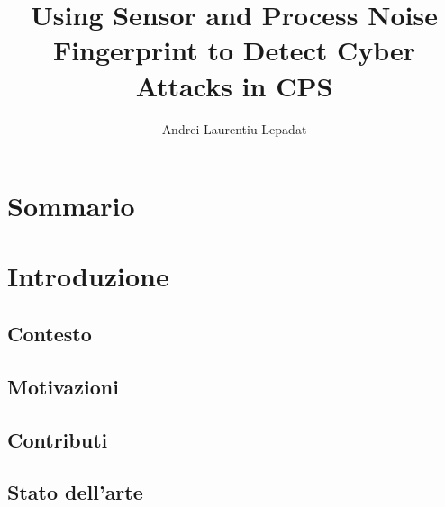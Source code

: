 \documentclass[Lau,binding=0.6cm]{sapthesis}
\title{Using Sensor and Process Noise Fingerprint to Detect Cyber Attacks in CPS}
\author{Andrei Laurentiu Lepadat}
\begin{document}
\frontmatter

\maketitle

\dedication{Decidere se inserire. Ne vale la pena?}


\tableofcontents

\chapter{Sommario} 


\mainmatter

\chapter{Introduzione}

\section{Contesto}

\section{Motivazioni}

\section{Contributi}

\section{Stato dell'arte}
\end{document}
